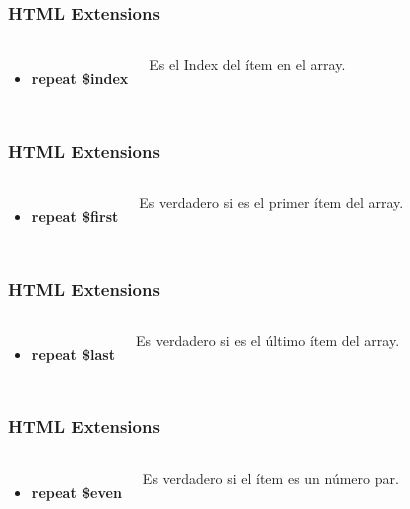 \documentclass{beamer}
\begin{document}
\begin{frame}
\frametitle{HTML Extensions}
\begin{columns}[c]
\begin{itemize}
\item \textbf{repeat \$index}
\end{itemize}
Es el Index del \'item en el array.
\end{columns}
\end{frame}
\begin{frame}
\frametitle{HTML Extensions}
\begin{columns}[c]
\begin{itemize}
\item \textbf{repeat \$first}
\end{itemize}
Es verdadero si es el primer \'item del array.
\end{columns}
\end{frame}
\begin{frame}
\frametitle{HTML Extensions}
\begin{columns}[c]
\begin{itemize}
\item \textbf{repeat \$last}
\end{itemize}
Es verdadero si es el \'ultimo \'item del array.
\end{columns}
\end{frame}
\begin{frame}
\frametitle{HTML Extensions}
\begin{columns}[c]
\begin{itemize}
\item \textbf{repeat \$even}
\end{itemize}
Es verdadero si el \'item es un n\'umero par.
\end{columns}
\end{frame}
\end{document}
